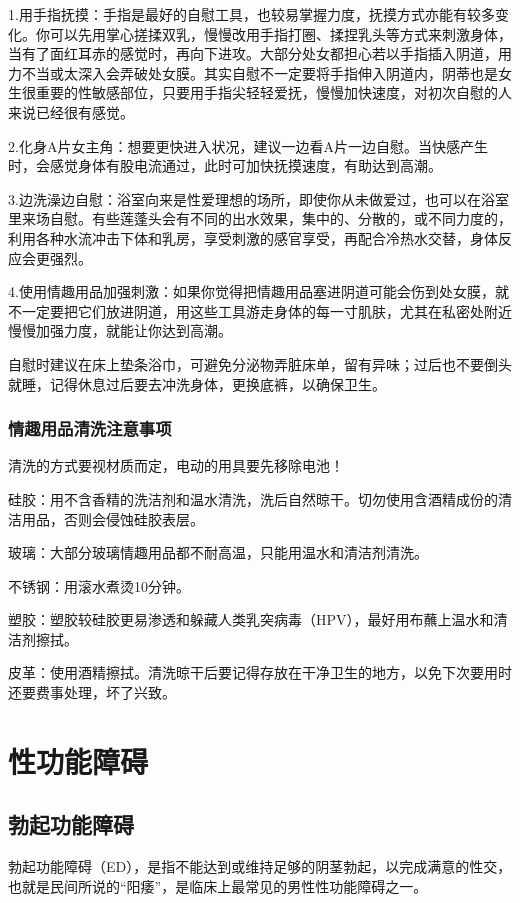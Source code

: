 \documentclass[12pt,UTF8]{ctexbook}
\begin{document}
1.用手指抚摸：手指是最好的自慰工具，也较易掌握力度，抚摸方式亦能有较多变化。你可以先用掌心搓揉双乳，慢慢改用手指打圈、揉捏乳头等方式来刺激身体，当有了面红耳赤的感觉时，再向下进攻。大部分处女都担心若以手指插入阴道，用力不当或太深入会弄破处女膜。其实自慰不一定要将手指伸入阴道内，阴蒂也是女生很重要的性敏感部位，只要用手指尖轻轻爱抚，慢慢加快速度，对初次自慰的人来说已经很有感觉。

2.化身A片女主角：想要更快进入状况，建议一边看A片一边自慰。当快感产生时，会感觉身体有股电流通过，此时可加快抚摸速度，有助达到高潮。

3.边洗澡边自慰：浴室向来是性爱理想的场所，即使你从未做爱过，也可以在浴室里来场自慰。有些莲蓬头会有不同的出水效果，集中的、分散的，或不同力度的，利用各种水流冲击下体和乳房，享受刺激的感官享受，再配合冷热水交替，身体反应会更强烈。

4.使用情趣用品加强刺激：如果你觉得把情趣用品塞进阴道可能会伤到处女膜，就不一定要把它们放进阴道，用这些工具游走身体的每一寸肌肤，尤其在私密处附近慢慢加强力度，就能让你达到高潮。

自慰时建议在床上垫条浴巾，可避免分泌物弄脏床单，留有异味；过后也不要倒头就睡，记得休息过后要去冲洗身体，更换底裤，以确保卫生。

\section{情趣用品清洗注意事项}

清洗的方式要视材质而定，电动的用具要先移除电池！

硅胶：用不含香精的洗洁剂和温水清洗，洗后自然晾干。切勿使用含酒精成份的清洁用品，否则会侵蚀硅胶表层。

玻璃：大部分玻璃情趣用品都不耐高温，只能用温水和清洁剂清洗。

不锈钢：用滚水煮烫10分钟。

塑胶：塑胶较硅胶更易渗透和躲藏人类乳突病毒（HPV），最好用布蘸上温水和清洁剂擦拭。

皮革：使用酒精擦拭。清洗晾干后要记得存放在干净卫生的地方，以免下次要用时还要费事处理，坏了兴致。

\part{性功能障碍}

\chapter{勃起功能障碍}

勃起功能障碍（ED），是指不能达到或维持足够的阴茎勃起，以完成满意的性交，也就是民间所说的“阳痿”，是临床上最常见的男性性功能障碍之一。
\end{document}

